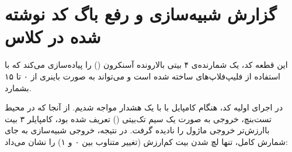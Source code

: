 \section*{گزارش شبیه‌سازی و رفع باگ کد نوشته شده در کلاس}

این قطعه کد، یک شمارنده‌ی ۴ بیتی بالا‌رونده آسنکرون () را پیاده‌سازی می‌کند که با استفاده از فلیپ‌فلاپ‌های  ساخته شده است و می‌تواند به صورت باینری از ۰ تا ۱۵ بشمارد.

در اجرای اولیه کد، هنگام کامپایل با  با یک هشدار مواجه شدیم. از آنجا که در محیط تست‌بنچ، خروجی به صورت یک سیم تک‌بیتی () تعریف شده بود، کامپایلر ۳ بیت باارزش‌تر خروجی ماژول  را نادیده گرفت. در نتیجه، خروجی شبیه‌سازی به جای شمارش کامل، تنها لچ شدن بیت کم‌ارزش (تغییر متناوب بین ۰ و ۱) را نشان می‌داد:

